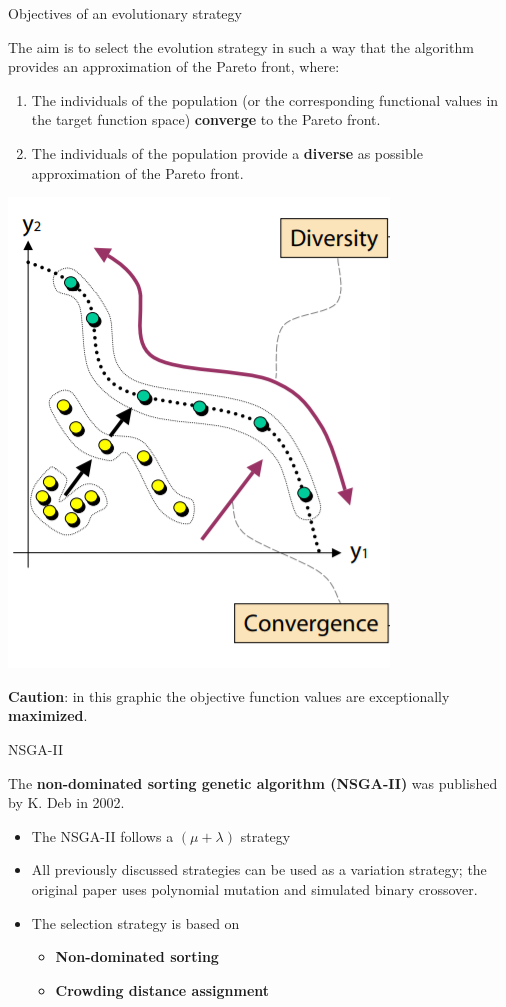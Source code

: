 \begin{frame}{Objectives of an evolutionary strategy}

The aim is to select the evolution strategy in such a way that the algorithm provides an approximation of the Pareto front, where:

\begin{enumerate}
\item The individuals of the population (or the corresponding functional values in the target function space) \textbf{converge} to the Pareto front.
\item The individuals of the population provide a \textbf{diverse} as possible approximation of the Pareto front.
\end{enumerate}

\vspace*{-0.3cm}

\begin{center}
\includegraphics[width = 0.2\linewidth]{images/EMO_goals.png}
\end{center}

\vspace*{-0.5cm}

\begin{footnotesize}
\textbf{Caution}: in this graphic the objective function values are exceptionally \textbf{maximized}. %
\end{footnotesize}

\end{frame}

\begin{frame}{NSGA-II}

The \textbf{non-dominated sorting genetic algorithm (NSGA-II)} was published by K. Deb in 2002.

\begin{itemize}
\item The NSGA-II follows a $(\mu + \lambda)$ strategy
\item All previously discussed strategies can be used as a variation strategy; the original paper uses polynomial mutation and simulated binary crossover.
\item The selection strategy is based on
\begin{itemize}
\item \textbf{Non-dominated sorting}
\item \textbf{Crowding distance assignment}
\end{itemize}
\end{itemize}

\end{frame}

